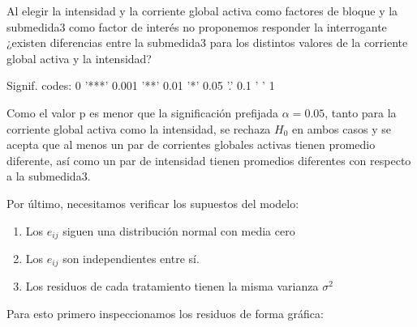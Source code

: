 \documentclass[a4paper,10pt,twocolumn]{report}
\begin{document}
	Al elegir la intensidad y la corriente global activa como factores de bloque y la submedida3 como factor de interés no proponemos responder la interrogante ¿existen diferencias entre la submedida3 para los distintos valores de la corriente global activa y la intensidad?
	
	\begin{table}[H]
	   Signif. codes:  0 '***' 0.001 '**' 0.01 '*' 0.05 '.' 0.1 ' ' 1	  
	   \caption{Salida de anova con dos factores de bloque} 
	   \label{tab:4}
	\end{table}
	
	Como el valor p es menor que la significación prefijada $\alpha=0.05$, tanto para la corriente global activa como la intensidad, se rechaza $H_0$ en ambos casos y se acepta que al menos un par de corrientes globales activas tienen promedio diferente, así como un par de intensidad tienen promedios diferentes con respecto a la submedida3.
	
	Por último, necesitamos verificar los supuestos del modelo:
	
	\begin{enumerate}
		\item Los $e_{ij}$ siguen una distribución normal con media cero
		\item Los $e_{ij}$ son independientes entre sí.
		\item Los residuos de cada tratamiento tienen la misma varianza $\sigma^2$
	\end{enumerate}

	Para esto primero inspeccionamos los residuos de forma gráfica:
	
\end{document}
